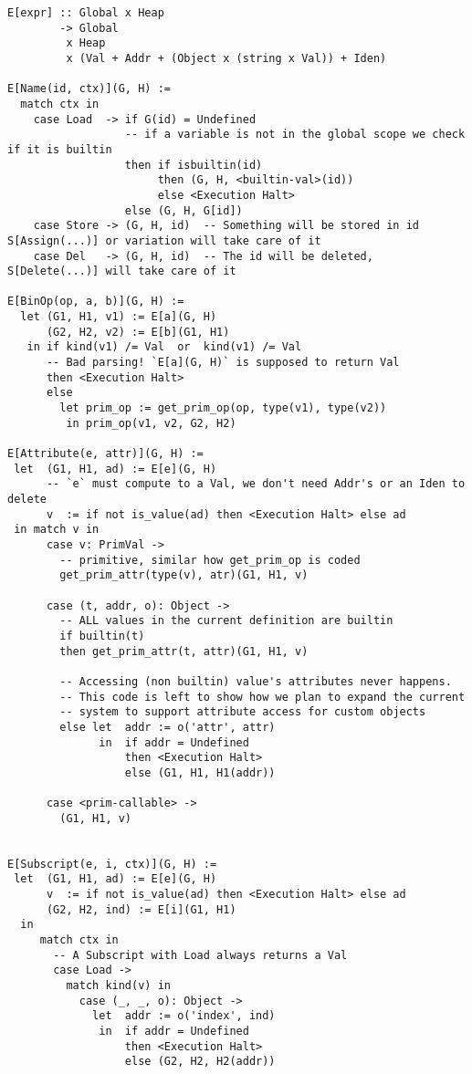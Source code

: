 \begin{verbatim}
E[expr] :: Global x Heap
        -> Global
         x Heap
         x (Val + Addr + (Object x (string x Val)) + Iden)

E[Name(id, ctx)](G, H) :=
  match ctx in
    case Load  -> if G(id) = Undefined
                  -- if a variable is not in the global scope we check if it is builtin
                  then if isbuiltin(id)
                       then (G, H, <builtin-val>(id))
                       else <Execution Halt>
                  else (G, H, G[id])
    case Store -> (G, H, id)  -- Something will be stored in id S[Assign(...)] or variation will take care of it
    case Del   -> (G, H, id)  -- The id will be deleted, S[Delete(...)] will take care of it

E[BinOp(op, a, b)](G, H) :=
  let (G1, H1, v1) := E[a](G, H)
      (G2, H2, v2) := E[b](G1, H1)
   in if kind(v1) /= Val  or  kind(v1) /= Val
      -- Bad parsing! `E[a](G, H)` is supposed to return Val
      then <Execution Halt>
      else
        let prim_op := get_prim_op(op, type(v1), type(v2))
         in prim_op(v1, v2, G2, H2)

E[Attribute(e, attr)](G, H) :=
 let  (G1, H1, ad) := E[e](G, H)
      -- `e` must compute to a Val, we don't need Addr's or an Iden to delete
      v  := if not is_value(ad) then <Execution Halt> else ad
 in match v in
      case v: PrimVal ->
        -- primitive, similar how get_prim_op is coded
        get_prim_attr(type(v), atr)(G1, H1, v)

      case (t, addr, o): Object ->
        -- ALL values in the current definition are builtin
        if builtin(t)
        then get_prim_attr(t, attr)(G1, H1, v)

        -- Accessing (non builtin) value's attributes never happens.
        -- This code is left to show how we plan to expand the current
        -- system to support attribute access for custom objects
        else let  addr := o('attr', attr)
              in  if addr = Undefined
                  then <Execution Halt>
                  else (G1, H1, H1(addr))

      case <prim-callable> ->
        (G1, H1, v)


E[Subscript(e, i, ctx)](G, H) :=
 let  (G1, H1, ad) := E[e](G, H)
      v  := if not is_value(ad) then <Execution Halt> else ad
      (G2, H2, ind) := E[i](G1, H1)
  in
     match ctx in
       -- A Subscript with Load always returns a Val
       case Load ->
         match kind(v) in
           case (_, _, o): Object ->
             let  addr := o('index', ind)
              in  if addr = Undefined
                  then <Execution Halt>
                  else (G2, H2, H2(addr))


\end{verbatim}

